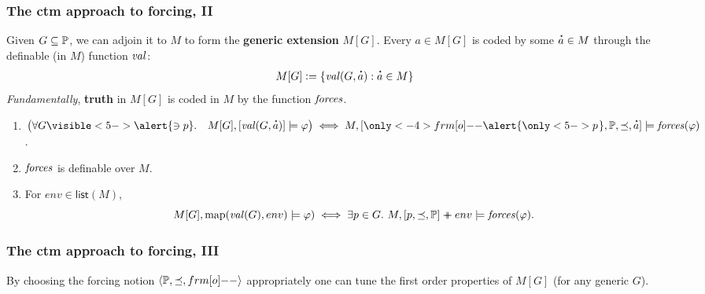\documentclass[english]{beamer}
\begin{document}
\begin{frame}
  \frametitle{The ctm approach to forcing, II}
  Given $G\subseteq \mathbb{P}$, we can adjoin it to $M$ to form the
  \textbf{generic extension} $M[G]$.
  \pause
  Every $a\in M[G]$ is coded by
  some $\punto{a}\in M$ through the definable (in $M$) function $\operatorname{\mathit{val}}$:
  \[
  M[G]\defi \{ \val(G,\punto{a}) : \punto{a}\in M\}
  \]
  \pause
  \emph{Fundamentally}, \textbf{truth} in $M[G]$ is coded in $M$ by the
  function $\mathit{forces}$.
  \pause
  \begin{theorem}[Cohen, 1963]
    \begin{enumerate}
    \item $\bigl(\forall G\visible<5->{\alert{\ni p}}.\quad M[G], [\val(G,\punto{a})]
      \models \phi\bigr)
      \iff
      M,
      [\only<-4>{\1}\alert{\only<5->{p\hspace{0.2ex}}},\PP,\preceq,\punto{a}]\models
      \forceisa(\phi)$.
    \item $\mathit{forces}$ is definable over $M$.
      \pause%
      \pause%
      \pause%
    \item For $env\in\mathsf{list}(M)$,
      \[
      M[G], \mathrm{map}(\operatorname{\mathit{val}}(G),env) \models \varphi)
      \iff
      \exists p\in G.\ M, [p,\preceq,\mathbb{P}] \mathbin{{+}\!\!\!\!{+}} env \models
      \mathit{forces}(\varphi).
      \]
    \end{enumerate}
  \end{theorem} 
\end{frame}

\begin{frame}
  \frametitle{The ctm approach to forcing, III}
  By choosing the forcing notion $\lb \PP, {\preceq} ,\1\rb$
  appropriately one can tune the first order properties of  $M[G]$ (for
  any generic $G$).
  \pause

  
\end{frame}
\end{document}
